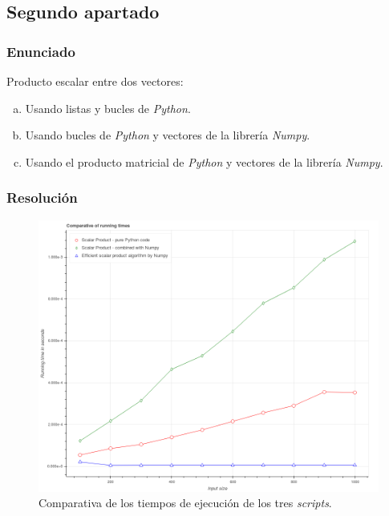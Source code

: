 \documentclass[12pt,twoside]{article}
\begin{document}

\subsection{Segundo apartado}

\subsubsection{Enunciado}

\noindent
Producto escalar entre dos vectores:

\begin{enumerate}[(a)]

\item Usando listas y bucles de \textit{Python}.

\item Usando bucles de \textit{Python} y vectores de la librería \textit{Numpy}.

\item Usando el producto matricial de \textit{Python} y vectores de la librería \textit{Numpy}.

\end{enumerate}

\subsubsection{Resolución}

\begin{figure}[hbt]
\begin{center}
	\includegraphics[width=1\textwidth]{21.png}
	\caption{Comparativa de los tiempos de ejecución de los tres \textit{scripts}.}
	\label{fig:fig2}
\end{center}
\end{figure}
\end{document}
